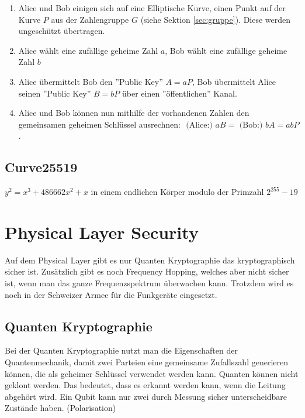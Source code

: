 \begin{enumerate}
	\item Alice und Bob einigen sich auf eine Elliptische Kurve, einen Punkt auf der Kurve $P$ aus der Zahlengruppe $G$ (siehe Sektion \ref{sec:gruppe}). Diese werden ungeschützt übertragen.
	\item Alice wählt eine zufällige geheime Zahl $a$, Bob wählt eine zufällige geheime Zahl $b$
	\item Alice übermittelt Bob den ''Public Key'' $A = aP$, Bob übermittelt Alice seinen ''Public Key'' $B = bP$ über einen ''öffentlichen'' Kanal.
	\item Alice und Bob können nun mithilfe der vorhandenen Zahlen den gemeinsamen geheimen Schlüssel ausrechnen: $\text{ (Alice:) } aB = \text{ (Bob:) } bA = abP$.
\end{enumerate}

\subsection{Curve25519}
$y^2 = x^3 + 486662x^2 + x$ in einem endlichen Körper modulo der Primzahl $2^{255} - 19$

\section{Physical Layer Security}
Auf dem Physical Layer gibt es nur Quanten Kryptographie das kryptographisch sicher ist. Zusätzlich gibt es noch Frequency Hopping, welches aber nicht sicher ist, wenn man das ganze Frequenzspektrum überwachen kann. Trotzdem wird es noch in der Schweizer Armee für die Funkgeräte eingesetzt.

\subsection{Quanten Kryptographie}
Bei der Quanten Kryptographie nutzt man die Eigenschaften der Quantenmechanik, damit zwei Parteien eine gemeinsame Zufallszahl generieren können, die als geheimer Schlüssel verwendet werden kann. Quanten können nicht geklont werden. Das bedeutet, dass es erkannt werden kann, wenn die Leitung abgehört wird. Ein Qubit kann nur zwei durch Messung sicher unterscheidbare Zustände haben. (Polarisation)

